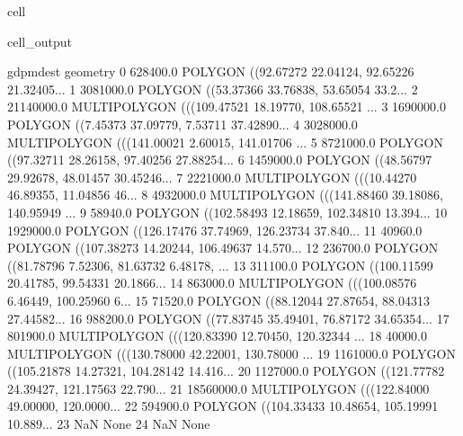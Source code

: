 \documentclass[letterpaper,10pt,english]{jupyterBook}
\begin{document}
\begin{sphinxuseclass}{cell}
\begin{sphinxVerbatimOutput}
\begin{sphinxuseclass}{cell_output}
\begin{sphinxVerbatim}[commandchars=\\\{\}]
    gdp\PYGZus{}md\PYGZus{}est                                           geometry  \PYGZbs{}
0     628400.0  POLYGON ((92.67272 22.04124, 92.65226 21.32405...   
1    3081000.0  POLYGON ((\PYGZhy{}53.37366 \PYGZhy{}33.76838, \PYGZhy{}53.65054 \PYGZhy{}33.2...   
2   21140000.0  MULTIPOLYGON (((109.47521 18.19770, 108.65521 ...   
3    1690000.0  POLYGON ((\PYGZhy{}7.45373 37.09779, \PYGZhy{}7.53711 37.42890...   
4    3028000.0  MULTIPOLYGON (((141.00021 \PYGZhy{}2.60015, 141.01706 ...   
5    8721000.0  POLYGON ((97.32711 28.26158, 97.40256 27.88254...   
6    1459000.0  POLYGON ((48.56797 29.92678, 48.01457 30.45246...   
7    2221000.0  MULTIPOLYGON (((10.44270 46.89355, 11.04856 46...   
8    4932000.0  MULTIPOLYGON (((141.88460 39.18086, 140.95949 ...   
9      58940.0  POLYGON ((102.58493 12.18659, 102.34810 13.394...   
10   1929000.0  POLYGON ((126.17476 37.74969, 126.23734 37.840...   
11     40960.0  POLYGON ((107.38273 14.20244, 106.49637 14.570...   
12    236700.0  POLYGON ((81.78796 7.52306, 81.63732 6.48178, ...   
13    311100.0  POLYGON ((100.11599 20.41785, 99.54331 20.1866...   
14    863000.0  MULTIPOLYGON (((100.08576 6.46449, 100.25960 6...   
15     71520.0  POLYGON ((88.12044 27.87654, 88.04313 27.44582...   
16    988200.0  POLYGON ((77.83745 35.49401, 76.87172 34.65354...   
17    801900.0  MULTIPOLYGON (((120.83390 12.70450, 120.32344 ...   
18     40000.0  MULTIPOLYGON (((130.78000 42.22001, 130.78000 ...   
19   1161000.0  POLYGON ((105.21878 14.27321, 104.28142 14.416...   
20   1127000.0  POLYGON ((121.77782 24.39427, 121.17563 22.790...   
21  18560000.0  MULTIPOLYGON (((\PYGZhy{}122.84000 49.00000, \PYGZhy{}120.0000...   
22    594900.0  POLYGON ((104.33433 10.48654, 105.19991 10.889...   
23         NaN                                               None   
24         NaN                                               None   


\end{sphinxVerbatim}
\end{sphinxuseclass}
\end{sphinxVerbatimOutput}
\end{sphinxuseclass}
\end{document}
